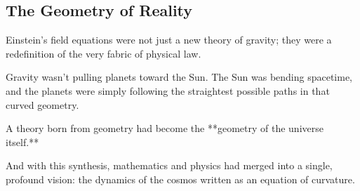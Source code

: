 \subsection*{The Geometry of Reality}

Einstein’s field equations were not just a new theory of gravity;  
they were a redefinition of the very fabric of physical law.

Gravity wasn’t pulling planets toward the Sun.  
The Sun was bending spacetime,  
and the planets were simply following the straightest possible paths in that curved geometry.

A theory born from geometry had become the **geometry of the universe itself.**

And with this synthesis, mathematics and physics had merged into a single, profound vision:  
the dynamics of the cosmos written as an equation of curvature.

